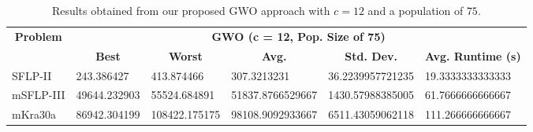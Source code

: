 \begin{table}[h!]
	\begin{adjustwidth}{-1.18in}{}
		\centering
		\begin{tabular}{|l|l|l|l|l|l|}
			\hline
			\multicolumn{1}{|c|}{\multirow{2}{*}{\textbf{Problem}}} & \multicolumn{5}{c|}{\textbf{GWO (c = 12, Pop. Size of 75)}} \\ \cline{2-6} 
			\multicolumn{1}{|c|}{}                                  & \multicolumn{1}{c|}{\textbf{Best}} & \multicolumn{1}{c|}{\textbf{Worst}} & \multicolumn{1}{c|}{\textbf{Avg.}} & \multicolumn{1}{c|}{\textbf{Std. Dev.}} & \multicolumn{1}{c|}{\textbf{Avg. Runtime (s)}} \\ \hline
			SFLP-II                                                 & 243.386427                                  & 413.874466                                   & 307.3213231                      & 36.2239957721235                                 & 19.3333333333333                                  \\ \hline
			mSFLP-III                                               & 49644.232903                                & 55524.684891                                 & 51837.8766529667						         & 1430.57988385005                              & 61.7666666666667                              \\ \hline
			mKra30a                                               & 86942.304199                                & 108422.175175                                 &
			98108.9092933667							&
			6511.43059062118							&
			111.266666666667						\\ \hline
		\end{tabular}
	\end{adjustwidth}
	\caption{Results obtained from our proposed GWO approach with $c = 12$ and a population of $75$.}
	\label{approach-gwo-c12-p75-results}
\end{table}

